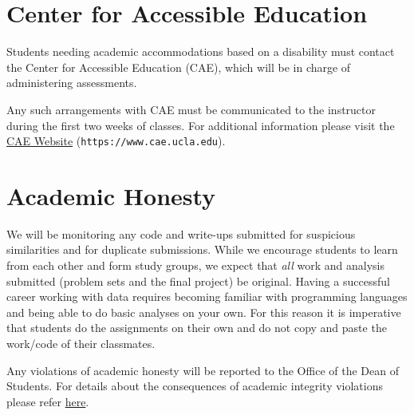 \documentclass[10pt]{article}
\begin{document}
\section*{Center for Accessible Education}

Students needing academic accommodations based on a disability must contact the Center for Accessible Education (CAE), which will be in charge of administering assessments.

Any such arrangements with CAE must be communicated to the instructor during the first two weeks of classes. For additional information please visit the \href{https://www.cae.ucla.edu/}{CAE Website} (\verb|https://www.cae.ucla.edu|).

\section*{Academic Honesty}

We will be monitoring any code and write-ups submitted for suspicious similarities and for duplicate submissions. While we encourage students to learn from each other and form study groups, we expect that \emph{all} work and analysis submitted (problem sets and the final project) be original. Having a successful career working with data requires becoming familiar with programming languages and being able to do basic analyses on your own. For this reason it is imperative that students do the assignments on their own and do not copy and paste the work/code of their classmates.  

Any violations of academic honesty will be reported to the Office of the Dean of Students. For details about the consequences of academic integrity violations please refer \href{https://www.deanofstudents.ucla.edu/Academic-Integrity/}{here}.
\end{document}
